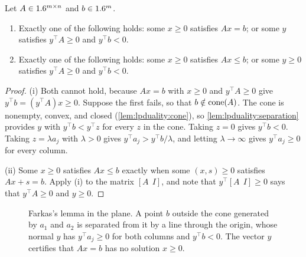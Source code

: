 \begin{refsection}
\begin{theorem}\label{thm:lpduality:farkas}
Let $A\in1.6^{m\times n}$ and $b\in1.6^m$.
\begin{enumerate}
\item Exactly one of the following holds: some $x\ge0$ satisfies $Ax=b$; or some $y$ satisfies $y^\top A\ge0$ and $y^\top b<0$.
\item Exactly one of the following holds: some $x\ge0$ satisfies $Ax\le b$; or some $y\ge0$ satisfies $y^\top A\ge0$ and $y^\top b<0$.
\end{enumerate}
\end{theorem}

\begin{proof}
(i) Both cannot hold, because $Ax=b$ with $x\ge0$ and $y^\top A\ge0$ give $y^\top b=(y^\top A)x\ge0$. Suppose the first fails, so that $b\notin\operatorname{cone}(A)$. The cone is nonempty, convex, and closed (\cref{lem:lpduality:cone}), so \cref{lem:lpduality:separation} provides $y$ with $y^\top b<y^\top z$ for every $z$ in the cone. Taking $z=0$ gives $y^\top b<0$. Taking $z=\lambda a_j$ with $\lambda>0$ gives $y^\top a_j>y^\top b/\lambda$, and letting $\lambda\to\infty$ gives $y^\top a_j\ge0$ for every column.

(ii) Some $x\ge0$ satisfies $Ax\le b$ exactly when some $(x,s)\ge0$ satisfies $Ax+s=b$. Apply (i) to the matrix $[A\ \ I]$, and note that $y^\top[A\ \ I]\ge0$ says that $y^\top A\ge0$ and $y\ge0$.
\end{proof}

\begin{figure}[t]
\centering
{}
\caption{Farkas's lemma in the plane. A point $b$ outside the cone generated by $a_1$ and $a_2$ is separated from it by a line through the origin, whose normal $y$ has $y^\top a_j\ge0$ for both columns and $y^\top b<0$. The vector $y$ certifies that $Ax=b$ has no solution $x\ge0$.}\label{fig:lpduality:farkas}
\end{figure}


\end{refsection}
